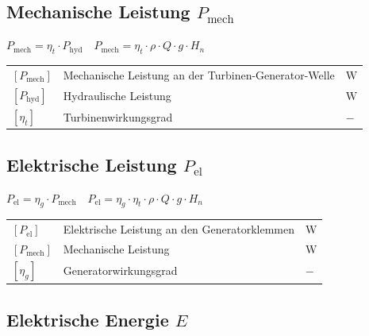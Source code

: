 \subsection{Mechanische Leistung $P_{\text{mech}}$}

$
\boxed{P_{\text{mech}} = \eta_t \cdot P_{\text{hyd}}} 
\quad 
\boxed{P_{\text{mech}} = \eta_t \cdot \rho \cdot Q \cdot g \cdot H_n}
$

\vspace{0.15cm}

\renewcommand{\arraystretch}{1.2}
\begin{tabular}{@{} l p{7cm} l @{}}
    $[P_{\text{mech}}]$  & Mechanische Leistung an der Turbinen-Generator-Welle \dotfill & $\text{W}$ \\
    $[P_{\text{hyd}}]$   & Hydraulische Leistung \dotfill                               & $\text{W}$ \\
    $[\eta_t]$           & Turbinenwirkungsgrad \dotfill                               & $-$ \\
\end{tabular}



\subsection{Elektrische Leistung $P_{\text{el}}$}

$
\boxed{P_{\text{el}} = \eta_g \cdot P_{\text{mech}}} 
\quad 
\boxed{P_{\text{el}} = \eta_g \cdot \eta_t \cdot \rho \cdot Q \cdot g \cdot H_n}
$

\vspace{0.15cm}

\renewcommand{\arraystretch}{1.2}
\begin{tabular}{@{} l p{6cm} l @{}}
    $[P_{\text{el}}]$     & Elektrische Leistung an den Generatorklemmen \dotfill & $\text{W}$ \\
    $[P_{\text{mech}}]$   & Mechanische Leistung \dotfill                          & $\text{W}$ \\
    $[\eta_g]$            & Generatorwirkungsgrad \dotfill                         & $-$ \\
\end{tabular}



\subsection{Elektrische Energie $E$}

